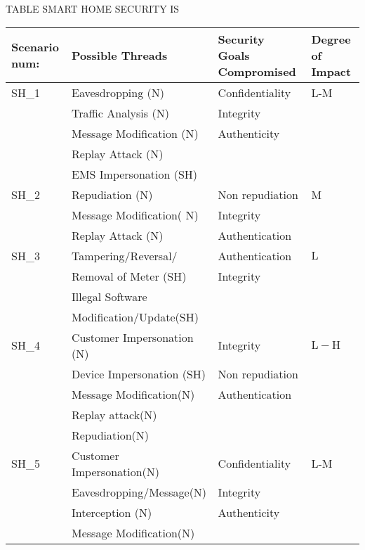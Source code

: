 TABLE SMART HOME SECURITY IS
\begin{tabular}{llll}
\hline \hline Scenario num: & Possible Threads & Security Goals Compromised & Degree of Impact \\
\hline SH_1 & Eavesdropping (N) & Confidentiality & L-M \\
& Traffic Analysis (N) & Integrity & \\
& Message Modification (N) & Authenticity & \\
& Replay Attack (N) & & \\
& EMS Impersonation (SH) & & \\
\hline SH_2 & Repudiation (N) & Non repudiation & M \\
& Message Modification( N) & Integrity & \\
& Replay Attack (N) & Authentication & \\
\hline SH_3 & Tampering/Reversal/ & Authentication & $\mathrm{L}$ \\
& Removal of Meter (SH) & Integrity & \\
& Illegal Software & & \\
& Modification/Update(SH) & & \\
\hline SH_4 & Customer Impersonation (N) & Integrity & $\mathrm{L}-\mathrm{H}$ \\
& Device Impersonation (SH) & Non repudiation & \\
& Message Modification(N) & Authentication & \\
& Replay attack(N) & & \\
& Repudiation(N) & & \\
\hline SH_5 & Customer Impersonation(N) & Confidentiality & L-M \\
& Eavesdropping/Message(N) & Integrity & \\
& Interception (N) & Authenticity & \\
& Message Modification(N) & & \\
\hline
\end{tabular}
